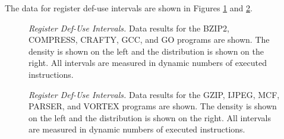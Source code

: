 %
The data for register def-use intervals are
shown in Figures \ref{fig:aa_ruse} 
and \ref{fig:ab_ruse}.
%
\begin{figure}
\centering
{}
\caption{{\em Register Def-Use Intervals.} 
\small{
Data results for the 
BZIP2, COMPRESS, CRAFTY, GCC, and GO programs are shown.
The density is shown on the left and the distribution is shown
on the right.
All intervals are measured in dynamic numbers of executed instructions.}
}
\label{fig:aa_ruse}
\end{figure}
%
\begin{figure}
\centering
{}
\caption{{\em Register Def-Use Intervals.} 
\small{
Data results for the
GZIP, IJPEG, MCF, PARSER, and VORTEX programs are shown.
The density is shown on the left and the distribution is shown
on the right.
All intervals are measured in dynamic numbers of executed instructions.}
}
\label{fig:ab_ruse}
\end{figure}
%
